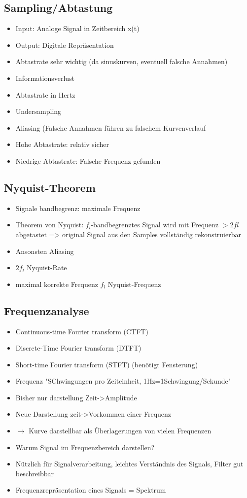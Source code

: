 \documentclass[a4paper,10pt,oneside]{article}
\begin{document}
\subsection{Sampling/Abtastung}
\begin{itemize}
	\item Input: Analoge Signal in Zeitbereich x(t)
	\item Output: Digitale Repräsentation 
	\item Abtastrate sehr wichtig (da sinuskurven, eventuell falsche Annahmen)
	\item Informationsverlust
	\item Abtastrate in Hertz
	\item Undersampling
	\item Aliasing (Falsche Annahmen führen zu falschem Kurvenverlauf
	\item Hohe Abtastrate: relativ sicher
	\item Niedrige Abtastrate: Falsche Frequenz gefunden
\end{itemize}

\subsection{Nyquist-Theorem}
\begin{itemize}
	\item Signale bandbegrenz: maximale Frequenz
	\item Theorem von Nyquist: $f_l$-bandbegrenztes Signal wird mit Frequenz $>2fl$ abgetastet => original Signal aus den Samples vollständig rekonstruierbar
	\item Ansonsten Aliasing
	\item $2f_l$ Nyquist-Rate
	\item maximal korrekte Frequenz $f_l$ Nyquist-Frequenz
\end{itemize}

\subsection{Frequenzanalyse}
\begin{itemize}
	\item Continuous-time Fourier transform (CTFT)
	\item Discrete-Time Fourier transform (DTFT)
	\item Short-time Fourier transform (STFT) (benötigt Fensterung)
	\item Frequenz "SChwingungen pro Zeiteinheit, 1Hz=1Schwingung/Sekunde"
	\item Bisher nur darstellung Zeit->Amplitude
	\item Neue Darstellung zeit->Vorkommen einer Frequenz
	\item $\rightarrow$ Kurve darstellbar als Überlagerungen von vielen Frequenzen
	\item Warum Signal im Frequenzbereich darstellen?
	\item Nützlich für Signalverarbeitung, leichtes Verständnis des Signals, Filter gut beschreibbar
	\item Frequenzrepräsentation eines Signals = Spektrum
\end{itemize}
\end{document}
